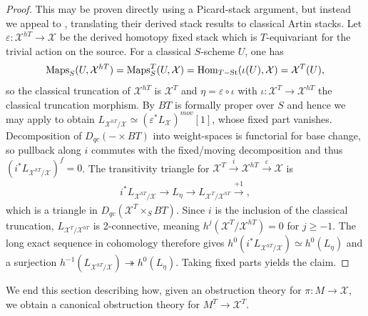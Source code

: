 \begin{proof}
  This may be proven directly using a Picard-stack argument, but instead we appeal to \cite[Cor. A.31]{aranha-khan-latyntsev-etal_VirtualLocalizationRevisited2025}, translating their derived stack results to classical Artin stacks.
  Let \(\varepsilon:\mathcal X^{hT}\to \mathcal X\) be the derived homotopy fixed stack \cite[Def. A.14, Rem A.15]{aranha-khan-latyntsev-etal_VirtualLocalizationRevisited2025} which is \(T\)-equivariant for the trivial action on the source. For a classical \(S\)-scheme \(U\), one has
  \begin{align*}
    \operatorname{Maps}_S(U,\mathcal X^{hT}) = \operatorname{Maps}_S^T(U, \mathcal X) = \operatorname{Hom}_{T-\operatorname{St}}(\iota(U), \mathcal X) = \mathcal X^T(U),
  \end{align*}
  so the classical truncation of \(\mathcal X^{hT}\) is \(\mathcal X^T\) and \(\eta = \varepsilon \circ \iota\) with \(\iota:\mathcal X^T\to \mathcal X^{hT}\) the classical truncation morphism. By \cite[Rem. A.19]{aranha-khan-latyntsev-etal_VirtualLocalizationRevisited2025} \(BT\) is formally proper over \(S\) and hence we may apply \cite[Cor. A.31]{aranha-khan-latyntsev-etal_VirtualLocalizationRevisited2025} to obtain \(L_{\mathcal X^{hT}/\mathcal X}\simeq (\varepsilon^*L_{\mathcal X})^{mov}[1]\), whose fixed part vanishes. Decomposition of \(D_{qc}(-\times BT)\) into weight-spaces is functorial for base change, so pullback along \(i\) commutes with the fixed/moving decomposition and thus \((i^*L_{\mathcal X^{hT}/\mathcal X})^{f} = 0\). The transitivity triangle for \(\mathcal X^T\xrightarrow{i}\mathcal X^{hT}\xrightarrow{\varepsilon}\mathcal X\) is
  \begin{align*}
    i^*L_{\mathcal X^{hT}/\mathcal X} \to L_\eta \to L_{\mathcal X^T/\mathcal X^{hT}} \xrightarrow{+1},
  \end{align*}
  which is a triangle in \(D_{qc}(\mathcal X^{T}\times_SBT)\). Since \(i\) is the inclusion of the classical truncation, \(L_{\mathcal X^T/\mathcal X^{hT}}\) is 2-connective, meaning \(h^j(\mathcal X^T/\mathcal X^{hT}) = 0\) for \(j \geq -1\). The long exact sequence in cohomology therefore gives \(h^0(i^*L_{\mathcal X^{hT}/\mathcal X}) \simeq h^0(L_\eta)\) and a surjection \(h^{-1}(L_{\mathcal X^{hT}/\mathcal X}) \twoheadrightarrow h^0(L_\eta)\). Taking fixed parts yields the claim.
\end{proof}
We end this section describing how, given an obstruction theory for \(\pi:M\to \mathcal X\), we obtain a canonical obstruction theory for \(M^T\to \mathcal X^T\).

